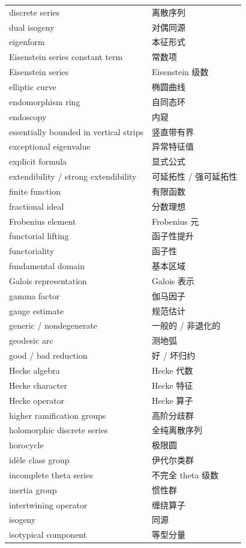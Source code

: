 {\begin{longtable}{@{}p{}p{}@{}}
discrete series & 离散序列 \\
dual isogeny & 对偶同源 \\
eigenform & 本征形式 \\
Eisenstein series constant term & 常数项 \\
Eisenstein series & Eisenstein 级数 \\
elliptic curve & 椭圆曲线 \\
endomorphism ring & 自同态环 \\
endoscopy & 内窥 \\
essentially bounded in vertical strips & 竖直带有界 \\
exceptional eigenvalue & 异常特征值 \\
explicit formula & 显式公式 \\
extendibility / strong extendibility & 可延拓性 / 强可延拓性 \\
finite function & 有限函数 \\
fractional ideal & 分数理想 \\
Frobenius element & Frobenius 元 \\
functorial lifting & 函子性提升 \\
functoriality & 函子性 \\
fundamental domain & 基本区域 \\
Galois representation & Galois 表示 \\
gamma factor & 伽马因子 \\
gauge estimate & 规范估计 \\
generic / nondegenerate & 一般的 / 非退化的 \\
geodesic arc & 测地弧 \\
good / bad reduction & 好 / 坏归约 \\
Hecke algebra & Hecke 代数 \\
Hecke character & Hecke 特征 \\
Hecke operator & Hecke 算子 \\
higher ramification groups & 高阶分歧群 \\
holomorphic discrete series & 全纯离散序列 \\
horocycle & 极限圆 \\
idèle class group & 伊代尔类群 \\
incomplete theta series & 不完全 theta 级数 \\
inertia group & 惯性群 \\
intertwining operator & 缠绕算子 \\
isogeny & 同源 \\
isotypical component & 等型分量 \\

\end{longtable}}
